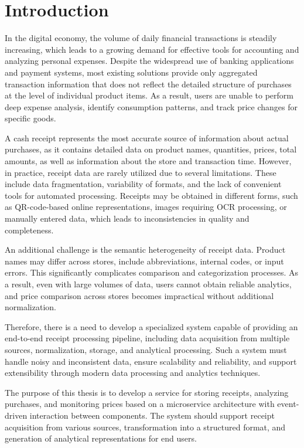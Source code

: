\chapter{Introduction}
\label{chap:intro}

In the digital economy, the volume of daily financial transactions is steadily increasing, which leads to a growing demand for effective tools for accounting and analyzing personal expenses. Despite the widespread use of banking applications and payment systems, most existing solutions provide only aggregated transaction information that does not reflect the detailed structure of purchases at the level of individual product items. As a result, users are unable to perform deep expense analysis, identify consumption patterns, and track price changes for specific goods.

A cash receipt represents the most accurate source of information about actual purchases, as it contains detailed data on product names, quantities, prices, total amounts, as well as information about the store and transaction time. However, in practice, receipt data are rarely utilized due to several limitations. These include data fragmentation, variability of formats, and the lack of convenient tools for automated processing. Receipts may be obtained in different forms, such as QR-code-based online representations, images requiring OCR processing, or manually entered data, which leads to inconsistencies in quality and completeness.

An additional challenge is the semantic heterogeneity of receipt data. Product names may differ across stores, include abbreviations, internal codes, or input errors. This significantly complicates comparison and categorization processes. As a result, even with large volumes of data, users cannot obtain reliable analytics, and price comparison across stores becomes impractical without additional normalization.

Therefore, there is a need to develop a specialized system capable of providing an end-to-end receipt processing pipeline, including data acquisition from multiple sources, normalization, storage, and analytical processing. Such a system must handle noisy and inconsistent data, ensure scalability and reliability, and support extensibility through modern data processing and analytics techniques.

The purpose of this thesis is to develop a service for storing receipts, analyzing purchases, and monitoring prices based on a microservice architecture with event-driven interaction between components. The system should support receipt acquisition from various sources, transformation into a structured format, and generation of analytical representations for end users.

